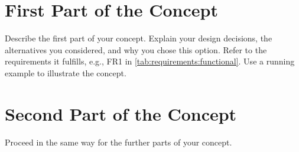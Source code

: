 \section{First Part of the Concept}\label{sec:concept:first}

Describe the first part of your concept.
Explain your design decisions, the alternatives you considered, and why you chose this option.
Refer to the requirements it fulfills, e.g., FR1 in \cref{tab:requirements:functional}.
Use a running example to illustrate the concept.

\section{Second Part of the Concept}\label{sec:concept:second}

Proceed in the same way for the further parts of your concept.
